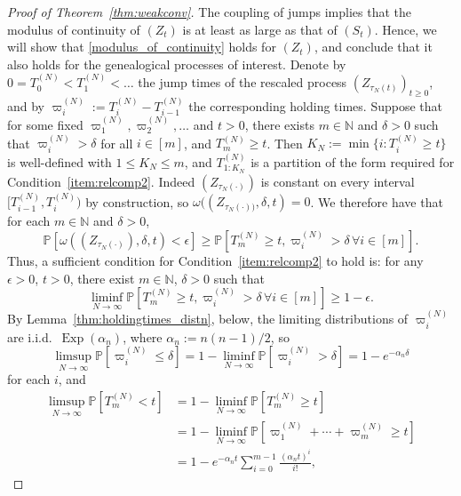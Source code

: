 \documentclass[12pt,authoryear]{article}
\theoremstyle{definition}
\newcommand{\Prob}{\mathbb{P}}
\newcommand{\1}[1]{\mathbbm{1}_{#1}}
\newcommand{\Exp}{\operatorname{Exp}}
\begin{document}
\begin{proof}[Proof of Theorem~\ref{thm:weakconv}]
The coupling of jumps implies that the modulus of continuity of $(Z_t)$ is at least as large as that of $(S_t)$.
Hence, we will show that \eqref{modulus_of_continuity} holds for $(Z_t)$, and conclude that it also holds for the genealogical processes of interest.
Denote by $0=T_0^{(N)}<T_1^{(N)}<\dots$ the jump times of the rescaled process $(Z_{\tau_N(t)})_{t\geq0}$, and by $\varpi_i^{(N)} := T_i^{(N)} - T_{i-1}^{(N)}$ the corresponding holding times.
Suppose that for some fixed $\varpi_1^{(N)}, \varpi_2^{(N)}, \dots$ and $t>0$, there exists $m \in \mathbb{N}$ and $\delta >0$ such that
$\varpi_i^{(N)} > \delta$ for all $i\in [m]$, and
$T_m^{(N)} \geq t$.
Then
$K_N := \min\{i : T_i^{(N)} \geq t\}$
is well-defined with $1\leq K_N \leq m$,
and $T_{ 1 : K_N }^{(N)}$ is a partition of the form required for Condition~\ref{item:relcomp2}.
Indeed $(Z_{\tau_N(\cdot)})$ is constant on every interval $[ T_{i-1}^{(N)} , T_i^{(N)} )$ by construction, so $\omega( (Z_{\tau_N(\cdot))} , \delta, t ) = 0$. 
We therefore have that
for each $m \in \mathbb{N}$ and $\delta >0$,
\begin{equation*}
\Prob\left[ \omega\left( (Z_{\tau_N(\cdot)}) , \delta, t \right) < \epsilon \right]
\geq \Prob\left[ T_m^{(N)} \geq t, \varpi_i^{(N)} > \delta \,\forall i\in [m] \right] .
\end{equation*}
Thus, a sufficient condition for Condition~\ref{item:relcomp2} to hold is: 
for any $\epsilon>0$, $t>0$, there exist $m\in\mathbb{N}$, $\delta>0$ such that
\begin{equation}\label{eq:condition2b}
\liminf_{N\to\infty} \Prob\left[ T_m^{(N)} \geq t, \varpi_i^{(N)} > \delta \,\forall i\in [m]\right]
\geq 1-\epsilon .
\end{equation}
By Lemma~\ref{thm:holdingtimes_distn}, below, the limiting distributions of $\varpi_i^{(N)}$ are i.i.d.\ $\Exp(\alpha_n)$, where $\alpha_n := n(n-1)/2$, so
\begin{equation*}
\limsup_{N\to\infty} \Prob\left[ \varpi_i^{(N)} \leq \delta \right] 
= 1- \liminf_{N\to\infty} \Prob\left[ \varpi_i^{(N)} > \delta \right] 
= 1- e^{-\alpha_n \delta}
\end{equation*}
for each $i$, and
\begin{align*}
\limsup_{N\to\infty} \Prob\left[ T_m^{(N)} < t \right]
&= 1- \liminf_{N\to\infty} \Prob\left[ T_m^{(N)} \geq t \right] \\
&= 1- \liminf_{N\to\infty} \Prob\left[ \varpi_1^{(N)} + \cdots + \varpi_m^{(N)} \geq t \right] \\
&= 1- e^{-\alpha_n t} \sum_{i=0}^{m-1} \frac{(\alpha_n t)^i}{i!},

\end{align*}
\end{proof}
\end{document}
